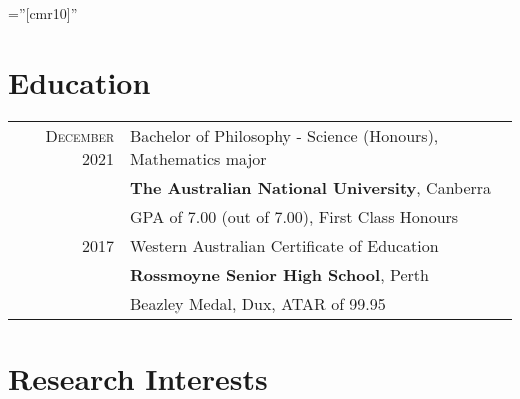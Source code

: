 \documentclass[a4paper,10pt]{article} %
\begin{document}
\pagestyle{empty} %

\font\fb=''[cmr10]'' %


\par{\par} %
\par{\par}


\section{Education}

\begin{tabular}{rl}	
\textsc{December} 2021 &  Bachelor of Philosophy - Science (Honours), Mathematics major\\& \normalsize\textbf{The Australian National University}, Canberra\\
&GPA of 7.00 (out of 7.00), First Class Honours\\


\textsc{} 2017 & Western Australian Certificate of Education\\&\textbf{Rossmoyne Senior High School}, Perth\\
& Beazley Medal, Dux, ATAR of 99.95\\
\end{tabular}


\section{Research Interests}
\end{document}
